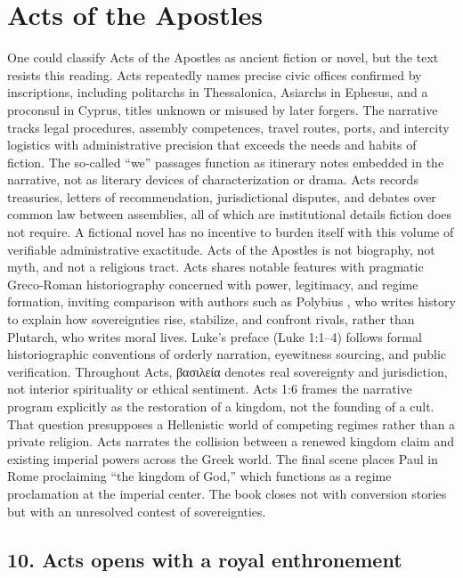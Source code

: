 \section{Acts of the Apostles}\label{subsec:acts-of-the-apostles}

One could classify Acts of the Apostles as ancient fiction or novel, but the text resists this reading.
Acts repeatedly names precise civic offices confirmed by inscriptions, including politarchs in Thessalonica, Asiarchs in Ephesus, and a proconsul in Cyprus, titles unknown or misused by later forgers.
The narrative tracks legal procedures, assembly competences, travel routes, ports, and intercity logistics with administrative precision that exceeds the needs and habits of fiction.
The so-called ``we'' passages function as itinerary notes embedded in the narrative, not as literary devices of characterization or drama.
Acts records treasuries, letters of recommendation, jurisdictional disputes, and debates over common law between assemblies, all of which are institutional details fiction does not require.
A fictional novel has no incentive to burden itself with this volume of verifiable administrative exactitude.
Acts of the Apostles is not biography, not myth, and not a religious tract.
Acts shares notable features with pragmatic Greco-Roman historiography concerned with power, legitimacy, and regime formation, inviting comparison with authors such as Polybius \cite{polybius:histories}, who writes history to explain how sovereignties rise, stabilize, and confront rivals, rather than Plutarch, who writes moral lives.
Luke's preface (Luke 1:1--4) follows formal historiographic conventions of orderly narration, eyewitness sourcing, and public verification.
Throughout Acts, βασιλεία denotes real sovereignty and jurisdiction, not interior spirituality or ethical sentiment.
Acts 1:6 frames the narrative program explicitly as the restoration of a kingdom, not the founding of a cult.
That question presupposes a Hellenistic world of competing regimes rather than a private religion.
Acts narrates the collision between a renewed kingdom claim and existing imperial powers across the Greek world.
The final scene places Paul in Rome proclaiming ``the kingdom of God,'' which functions as a regime proclamation at the imperial center.
The book closes not with conversion stories but with an unresolved contest of sovereignties.

\subsection{10.
Acts opens with a royal enthronement}\label{subsec:acts-opens-with-a-royal-enthronement}

